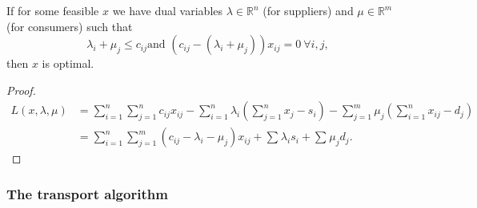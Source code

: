 \documentclass[a4paper]{scrartcl}
\begin{document}
\begin{theorem}
	 If for some feasible $x$ we have dual variables $\lambda \in \mathbb{R}^{n} $ (for suppliers) and $\mu \in \mathbb{R}^{m} $ (for consumers) such that \[
	 \lambda_{i}+\mu_{j} \leq c_{ij} \text{and } (c_{ij}-(\lambda_{i}+\mu_j))x_{ij}=0 \ \forall i,j 
	 ,\] then $x$ is optimal.
\end{theorem}
\begin{proof}
	 \begin{align*}
		L (x,\lambda,\mu)&=\sum_{i=1}^{n}\sum_{j=1}^{n}c_{ij}x_{ij}-\sum_{i=1}^{n}\lambda_{i}(\sum_{j=1}^{n}x_{j}-s_i) - \sum_{j=1}^{m}\mu_{j} (\sum_{i=1}^{n}x_{ij}-d_{j})\\&=\sum_{i=1}^{n}\sum_{j=1}^{m}(c_{ij}-\lambda_{i}-\mu_{j})x_{ij}+\sum_{}^{}\lambda_{i}s_i +\sum_{}^{}\mu_{j}d_{j}.
	 \end{align*}
\end{proof}
\subsubsection{The transport algorithm}
\end{document}
